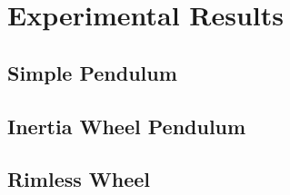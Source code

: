 \section{Experimental Results}
\label{sec:bl_results}

\subsection{Simple Pendulum}

\subsection{Inertia Wheel Pendulum}

\subsection{Rimless Wheel}